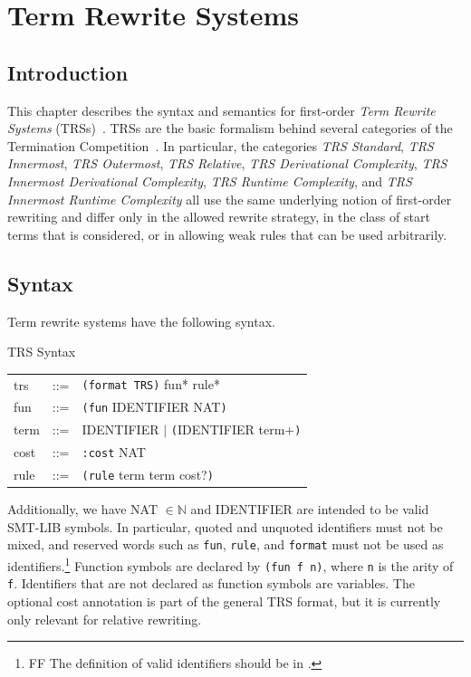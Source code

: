 \chapter{Term Rewrite Systems}\label{chap:TRS}

\section{Introduction}

This chapter describes the syntax and semantics for first-order \emph{Term Rewrite Systems} (TRSs)~\cite{baader1998TermRewriting,terese2003TermRewritingSystems}.
TRSs are the basic formalism behind several categories of the Termination Competition~\cite{giesl2019TerminationComplexityCompetition}.
In particular, the categories \emph{TRS Standard}, \emph{TRS Innermost}, \emph{TRS Outermost}, \emph{TRS Relative}, 
\emph{TRS Derivational Complexity}, \emph{TRS Innermost Derivational Complexity}, \emph{TRS Runtime Complexity}, 
and \emph{TRS Innermost Runtime Complexity} all use the same underlying notion of first-order rewriting 
and differ only in the allowed rewrite strategy, in the class of start terms that is considered, or in allowing weak rules that can be used arbitrarily.


\section{Syntax}

Term rewrite systems have the following syntax.

\begin{grammar}{TRS Syntax}
  \begin{tabular}{lll}
  trs & ::= & \texttt{(format TRS)} fun* rule* \\
  fun & ::= & \texttt{(fun} IDENTIFIER NAT\texttt{)} \\
  term & ::= & IDENTIFIER $|$ \texttt{(}IDENTIFIER term+\texttt{)} \\
  cost & ::= & \texttt{:cost} NAT \\
  rule & ::= & \texttt{(rule} term term cost?\texttt{)} \\
  \end{tabular}
\end{grammar}

\bigskip
Additionally, we have NAT $\in \mathbb{N}$ and IDENTIFIER are intended to be valid SMT-LIB symbols.
In particular, quoted and unquoted identifiers must not be mixed, and reserved words such as 
\texttt{fun}, \texttt{rule}, and \texttt{format} must not be used as identifiers.\footnote{FF The definition of valid identifiers should be in .}
Function symbols are declared by \texttt{(fun f n)}, where \texttt{n} is the arity of \texttt{f}.
Identifiers that are not declared as function symbols are variables.
The optional cost annotation is part of the general TRS format, 
but it is currently only relevant for relative rewriting.

